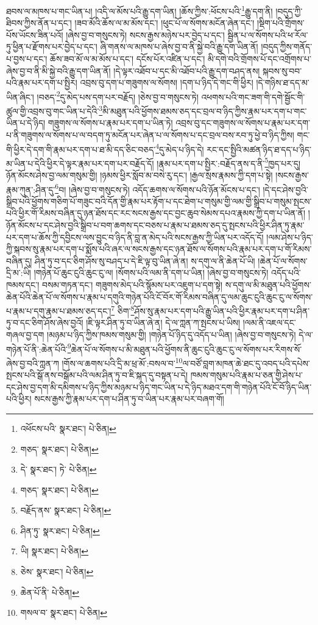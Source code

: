 ཐབས་ལ་མཁས་པ་གང་ཡིན་པ། །འདི་ལ་མོས་པའི་རྒྱུ་དག་ཡིན། །ཆོས་ཀྱིས་:ཕོངས་པའི་\footnote{འཕོངས་པའི་  སྣར་ཐང་།  པེ་ཅིན། }རྒྱུ་དག་ནི། །བདུད་ཀྱི་ཐིབས་ཀྱིས་ནོན་པ་དང་། །ཟབ་མོའི་ཆོས་ལ་མ་མོས་དང་། །ཕུང་པོ་ལ་སོགས་མངོན་ཞེན་དང་། །སྡིག་པའི་གྲོགས་པོས་ཡོངས་ཟིན་པའོ། །ཞེས་བྱ་བ་གསུངས་ཏེ། སངས་རྒྱས་མཉེས་པར་བྱེད་པ་དང་། སྦྱིན་པ་ལ་སོགས་པའི་ཕ་རོལ་ཏུ་ཕྱིན་པ་རྫོགས་པར་བྱེད་པ་དང་། ཞི་གནས་ལ་མཁས་པ་ཞེས་བྱ་བ་ནི་སྐྱེ་བའི་རྒྱུ་དག་ཡིན་ནོ། །བདུད་ཀྱིས་གནོད་པ་བྱས་པ་དང་། ཆོས་ཟབ་མོ་ལ་མ་མོས་པ་དང་། དངོས་པོར་འཛིན་པ་དང་། མི་དགེ་བའི་གྲོགས་པོ་དང་འགྲོགས་པ་ཞེས་བྱ་བ་ནི་མི་སྐྱེ་བའི་རྒྱུ་དག་ཡིན་ནོ། །དེ་ལྟར་འཐོབ་པ་དང་མི་འཐོབ་པའི་རྒྱུ་དག་བཤད་ནས། སྐབས་སུ་བབ་པའི་རྣམ་པར་དག་པ་སྤྱིར། འབྲས་བུ་དག་པ་གཟུགས་ལ་སོགས། །དག་པ་ཉིད་དེ་གང་གི་ཕྱིར། །དེ་གཉིས་ཐ་དད་མ་ཡིན་ཞིང་། །བཅད་\footnote{གཅད་  སྣར་ཐང་།  པེ་ཅིན། }དུ་མེད་པས་དག་པར་བརྗོད། །ཅེས་བྱ་བ་གསུངས་ཏེ། འཕགས་པའི་གང་ཟག་གི་དགེ་སྦྱོང་གི་ཚུལ་གྱི་འབྲས་བུ་གང་ཡིན་པ་དེའི་\footnote{དེ་  སྣར་ཐང་། ཏེ་  པེ་ཅིན། }མི་མཐུན་པའི་ཕྱོགས་ཐམས་ཅད་དང་བྲལ་བ་ཉིད་ཀྱིས་རྣམ་པར་དག་པ་གང་ཡིན་པ་དེ་ཉིད། གཟུགས་ལ་སོགས་པ་རྣམ་པར་དག་པ་ཡིན་ཏེ། འབྲས་བུ་དང་གཟུགས་ལ་སོགས་པ་རྣམ་པར་དག་པ་ནི་གཟུགས་ལ་སོགས་པ་ལ་བདག་ཏུ་མངོན་པར་ཞེན་པ་ལ་སོགས་པ་དང་བྲལ་བས་རབ་ཏུ་ཕྱེ་བ་ཉིད་ཀྱིས། གང་གི་ཕྱིར་དེ་དག་གི་རྣམ་པར་དག་པ་ཐ་མི་དད་ཅིང་བཅད་\footnote{གཅད་  སྣར་ཐང་།  པེ་ཅིན། }དུ་མེད་པ་ཉིད་དེ། རང་དང་སྤྱིའི་མཚན་ཉིད་ཐ་དད་པ་ཉིད་མ་ཡིན་པ་དེའི་ཕྱིར་དེ་ལྟར་རྣམ་པར་དག་པར་བརྗོད་དོ། །རྣམ་པར་དག་པ་སྤྱིར་:བརྗོད་ནས་ད་ནི་\footnote{བརྗོད་ནས་  སྣར་ཐང་།  པེ་ཅིན། }ཁྱད་པར་དུ། ཉོན་མོངས་ཤེས་བྱ་ལམ་གསུམ་གྱི། །ཉམས་ཕྱིར་སློབ་མ་བསེ་རུ་དང་། །རྒྱལ་སྲས་རྣམས་ཀྱི་དག་པ་སྟེ། །སངས་རྒྱས་རྣམ་ཀུན་:ཤིན་དུ་\footnote{ཤིན་ཏུ་  སྣར་ཐང་།  པེ་ཅིན། }བ། །ཞེས་བྱ་བ་གསུངས་ཏེ། འདོད་ཆགས་ལ་སོགས་པའི་ཉོན་མོངས་པ་དང་། །དེ་དང་ཤེས་བྱའི་སྒྲིབ་པའི་ཕྱོགས་གཅིག་པོ་གཟུང་བའི་དོན་གྱི་རྣམ་པར་རྟོག་པ་དང་ཐེག་པ་གསུམ་གྱི་ལམ་གྱི་སྒྲིབ་པ་གསུམ་སྤངས་པའི་ཕྱིར་གོ་རིམས་བཞིན་དུ་ཉན་ཐོས་དང་རང་སངས་རྒྱས་དང་བྱང་ཆུབ་སེམས་དཔའ་རྣམས་ཀྱི་དག་པ་ཡིན་ནོ། །ཉོན་མོངས་པ་དང་ཤེས་བྱའི་སྒྲིབ་པ་བག་ཆགས་དང་བཅས་པ་རྣམ་པ་ཐམས་ཅད་དུ་སྤངས་པའི་ཕྱིར་ཤིན་ཏུ་རྣམ་པར་དག་པ་ཆོས་ཀྱི་དབྱིངས་ལས་བྱུང་བ་ཉིད་ནི་བླ་ན་མེད་པའི་སངས་རྒྱས་ཀྱི་ཡིན་པར་འདོད་དོ། །ལམ་ཤེས་པ་ཉིད་ཀྱི་སྐབས་སུ་རྣམ་པར་དག་པ་སྨོས་པའི་ཞར་ལ་སངས་རྒྱས་དང་ཉན་ཐོས་ལ་སོགས་པའི་རྣམ་པར་དག་པ་གོ་རིམས་བཞིན་དུ། ཤིན་ཏུ་བ་དང་ཅིག་ཤོས་སུ་བཤད་པ་དེ་ཇི་ལྟ་བུ་ཡིན་ཞེ་ན། ས་དགུ་ལ་ནི་ཆེན་པོ་ཡི། །ཆེན་པོ་ལ་སོགས་དྲི་མ་:ཡི། །གཉེན་པོ་ཆུང་ངུའི་ཆུང་ངུ་ལ། །སོགས་པའི་ལམ་ནི་དག་པ་ཡིན། །ཞེས་བྱ་བ་གསུངས་ཏེ། འདོད་པའི་ཁམས་དང་། བསམ་གཏན་དང་། གཟུགས་མེད་པའི་སྙོམས་པར་འཇུག་པ་དག་སྟེ། ས་དགུ་ལ་མི་མཐུན་པའི་ཕྱོགས་ཆེན་པོའི་ཆེན་པོ་ལ་སོགས་པ་རྣམ་པ་དགུའི་གཉེན་པོའི་ངོ་བོར་གོ་རིམས་བཞིན་དུ་ལམ་ཆུང་ངུའི་ཆུང་ངུ་ལ་སོགས་པ་རྣམ་པ་དགུ་རྣམ་པ་ཐམས་ཅད་དང་།\footnote{ཡི།  སྣར་ཐང་།  པེ་ཅིན། } ཅིག་\footnote{ཅེས་  སྣར་ཐང་།  པེ་ཅིན། }ཤོས་སུ་རྣམ་པར་དག་པའི་རྒྱུ་ཡིན་པའི་ཕྱིར་རྣམ་པར་དག་པ་ཤིན་ཏུ་བ་དང་ཅིག་ཤོས་ཞེས་བྱའོ། །ཇི་ལྟར་ཤིན་ཏུ་བ་ཡིན་ཞེ་ན། དེ་ལ་ཀླན་ཀ་སྤངས་པ་ཡིས། །ལམ་ནི་འཇལ་དང་གཞལ་བྱ་དག །མཉམ་པ་ཉིད་ཀྱིས་ཁམས་གསུམ་གྱི། །གཉེན་པོ་ཉིད་དུ་འདོད་པ་ཡིན། །ཞེས་བྱ་བ་གསུངས་ཏེ། དེ་ལ་གཉེན་པོ་ནི་:ཆེན་པོའི་\footnote{ཆེན་པོ་ནི་  པེ་ཅིན། }ཆེན་པོ་ལ་སོགས་པ་མི་མཐུན་པའི་ཕྱོགས་ནི་ཆུང་ངུའི་ཆུང་ངུ་ལ་སོགས་པར་རིགས་སོ་ཞེས་བྱ་བའི་ཀླན་ཀ །གོས་ལ་ཆགས་པའི་དྲི་མ་ཕྲ་མོ་:བསལ་བ་\footnote{གསལ་བ་  སྣར་ཐང་།  པེ་ཅིན། }ལ་བཙོ་བླག་མཁན་ཆེ་ཐང་དུ་འབད་པའི་དཔེས་སྤངས་པའི་སྒོ་ནས་བསྒོམ་པའི་ལམ་ཤིན་ཏུ་བ་ཇི་སྐད་དུ་བསྟན་པ་དེ། ཁམས་གསུམ་པའི་རྣམ་པ་ཅན་གྱི་ཤེས་པ་དང་ཤེས་བྱ་དག་མི་དམིགས་པ་ཉིད་ཀྱིས་མཉམ་པ་ཉིད་གང་ཡིན་པ་དེ་ཉིད་མཐའ་དག་གི་གཉེན་པོའི་ངོ་བོ་ཉིད་ཡིན་པའི་ཕྱིར། སངས་རྒྱས་ཀྱི་རྣམ་པར་དག་པ་ཤིན་ཏུ་བ་ཡིན་པར་རྣམ་པར་བཞག་གོ། 